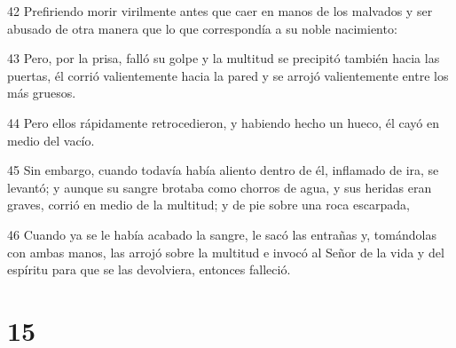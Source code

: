 \par 42 Prefiriendo morir virilmente antes que caer en manos de los malvados y ser abusado de otra manera que lo que correspondía a su noble nacimiento:
\par 43 Pero, por la prisa, falló su golpe y la multitud se precipitó también hacia las puertas, él corrió valientemente hacia la pared y se arrojó valientemente entre los más gruesos.
\par 44 Pero ellos rápidamente retrocedieron, y habiendo hecho un hueco, él cayó en medio del vacío.
\par 45 Sin embargo, cuando todavía había aliento dentro de él, inflamado de ira, se levantó; y aunque su sangre brotaba como chorros de agua, y sus heridas eran graves, corrió en medio de la multitud; y de pie sobre una roca escarpada,
\par 46 Cuando ya se le había acabado la sangre, le sacó las entrañas y, tomándolas con ambas manos, las arrojó sobre la multitud e invocó al Señor de la vida y del espíritu para que se las devolviera, entonces falleció.

\chapter{15}

